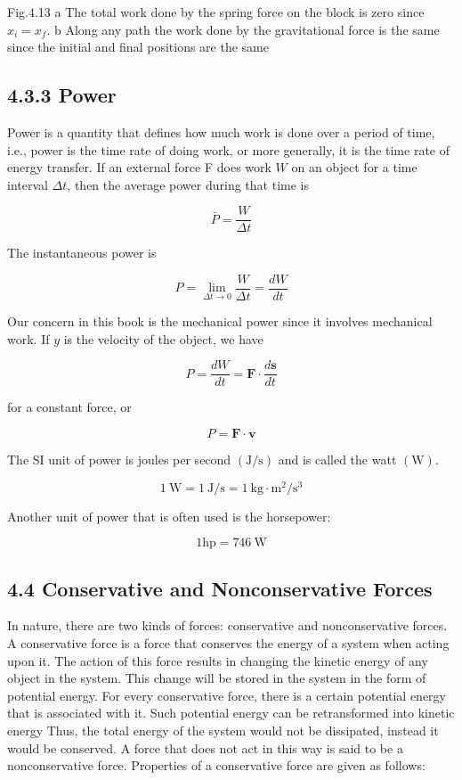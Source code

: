 \documentclass[10pt]{article}
\begin{document}
Fig.4.13 a The total work done by the spring force on the block is zero since $x_{i}=x_{f}$. b Along any path the work done by the gravitational force is the same since the initial and final positions are the same

\subsection*{4.3.3 Power}
Power is a quantity that defines how much work is done over a period of time, i.e., power is the time rate of doing work, or more generally, it is the time rate of energy transfer. If an external force F does work $W$ on an object for a time interval $\Delta t$, then the average power during that time is

$$
\bar{P}=\frac{W}{\Delta t}
$$

The instantaneous power is

$$
P=\lim _{\Delta t \rightarrow 0} \frac{W}{\Delta t}=\frac{d W}{d t}
$$

Our concern in this book is the mechanical power since it involves mechanical work. If $y$ is the velocity of the object, we have

$$
P=\frac{d W}{d t}=\mathbf{F} \cdot \frac{d \mathbf{s}}{d t}
$$

for a constant force, or

$$
P=\mathbf{F} \cdot \mathbf{v}
$$

The SI unit of power is joules per second $(\mathrm{J} / \mathrm{s})$ and is called the watt $(\mathrm{W})$.

$$
1 \mathrm{~W}=1 \mathrm{~J} / \mathrm{s}=1 \mathrm{~kg} \cdot \mathrm{m}^{2} / \mathrm{s}^{3}
$$

Another unit of power that is often used is the horsepower:

$$
1 \mathrm{hp}=746 \mathrm{~W}
$$

\subsection*{4.4 Conservative and Nonconservative Forces}
In nature, there are two kinds of forces: conservative and nonconservative forces. A conservative force is a force that conserves the energy of a system when acting upon it. The action of this force results in changing the kinetic energy of any object in the system. This change will be stored in the system in the form of potential energy. For every conservative force, there is a certain potential energy that is associated with it. Such potential energy can be retransformed into kinetic energy Thus, the total energy of the system would not be dissipated, instead it would be conserved. A force that does not act in this way is said to be a nonconservative force. Properties of a conservative force are given as follows:
\end{document}
